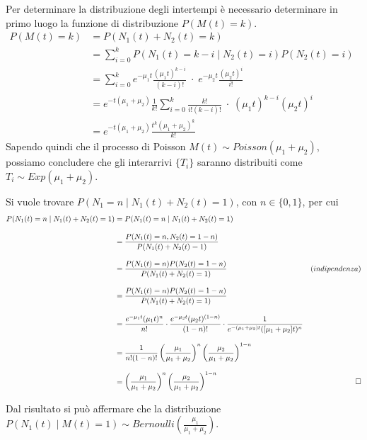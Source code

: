 \documentclass{homework}
\begin{document}
\exercise*[2.a] \label{2a}
Per determinare la distribuzione degli intertempi è necessario determinare in primo luogo la funzione di distribuzione $P(M(t) = k)$.
\[
\begin{align}
P(M(t) = k) &= P(N_1(t) + N_2(t) = k)&&\\
            &= \sum_{i = 0}^k P(N_1(t) = k - i \mid N_2(t) = i) P(N_2(t) = i)&&\\
            &= \sum_{i = 0}^k e^{-\mu_1 t} \frac{(\mu_1 t)^{k - i}}{(k-i)!} \; \cdot \; e^{-\mu_2 t} \frac{(\mu_2 t)^i}{i!} &&\\
            &= e^{-t(\mu_1 + \mu_2)} \frac{1}{k!} \sum_{i = 0}^k \frac{k!}{i!(k-i)!} \; \cdot \; (\mu_1 t)^{k-i} (\mu_2 t)^i &&\\
            &= e^{-t(\mu_1 + \mu_2)} \frac{t^k(\mu_1 + \mu_2)^k}{k!}
\end{align}
\]
Sapendo quindi che il processo di Poisson $M(t) \sim Poisson(\mu_1 + \mu_2)$, possiamo concludere che gli interarrivi $\{T_i\}$ saranno distribuiti come $T_i \sim Exp(\mu_1 + \mu_2)$.

\exercise*[2.b]
Si vuole trovare $P(N_1 = n \mid N_1(t) + N_2(t) = 1)$, con $n \in \{0,1\}$, per cui 
\begin{align}
P(N_1(t) = n \mid N_1(t) + N_2(t) = 1) &= P(N_1(t) = n \mid N_1(t) + N_2(t) = 1)\nonumber\\[2ex]
                             &= \frac{P(N_1(t) = n, N_2(t) = 1 - n)}{P(N_1(t) + N_2(t) = 1)}\nonumber\\[2ex]
                             &= \frac{P(N_1(t) = n) P(N_2(t) = 1 - n)}{P(N_1(t) + N_2(t) = 1)} & (indipendenza)\nonumber\\[2ex]
                             &= \frac{P(N_1(t) = n) P(N_2(t) = 1 - n)}{P(N_1(t) + N_2(t) = 1)}\nonumber\\[2ex]\nonumber
                             &= \frac{e^{-\mu_1 t} (\mu_1 t)^n}{n!} \cdot \frac{e^{-\mu_2 t} (\mu_2 t)^{(1 - n)}}{(1 - n)!} \cdot \frac{1}{e^{-(\mu_1 + \mu_2) t} ([\mu_1 + \mu_2] t)^n}\nonumber\\[2ex]
                             &= \frac{1}{n!(1-n)!} \left(\frac{\mu_1}{\mu_1 + \mu_2}\right)^n \left(\frac{\mu_2}{\mu_1 + \mu_2}\right)^{1-n}\nonumber\\[2ex]
                             &= \left(\frac{\mu_1}{\mu_1 + \mu_2}\right)^n \left(\frac{\mu_2}{\mu_1 + \mu_2}\right)^{1-n}\nonumber&\qed
\end{align}

Dal risultato si può affermare che la distribuzione $P(N_1(t) \mid M(t) = 1) \sim Bernoulli\left(\frac{\mu_1}{\mu_1 + \mu_2}\right)$.
\end{document}
